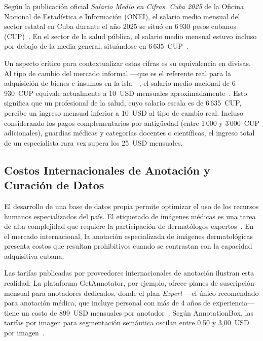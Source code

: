Según la publicación oficial \textit{Salario Medio en Cifras. Cuba 2025} de la Oficina Nacional de 
Estadística e Información (ONEI), el salario medio mensual del sector estatal en Cuba durante el año 
2025 se situó en 6\,930 pesos cubanos (CUP)~\cite{onei_salario_2025}. En el sector de la salud pública, el 
salario medio mensual estuvo incluso por debajo de la media general, situándose en 6\,635~CUP~\cite{onei_salario_2025}.

Un aspecto crítico para contextualizar estas cifras es su equivalencia en divisas. Al tipo de cambio 
del mercado informal ---que es el referente real para la adquisición de bienes e insumos en la 
isla---, el salario medio nacional de 6\,930~CUP equivale actualmente a 10~USD mensuales aproximadamente~\cite{el_toque_exchange_rates}. 
Esto significa que un profesional de la salud, 
cuyo salario escala es de 6\,635~CUP, percibe un ingreso mensual inferior a 10~USD al tipo de cambio 
real. Incluso considerando los pagos complementarios por antigüedad (entre 1\,000 y 3\,000~CUP 
adicionales), guardias médicas y categorías docentes o científicas, el ingreso total de un especialista 
rara vez supera los 25~USD mensuales.


\subsection{Costos Internacionales de Anotación y Curación de Datos}\label{sec:etiquetado}

El desarrollo de una base de datos propia permite optimizar el uso de los recursos humanos especializados del 
país. El etiquetado de imágenes médicas es una tarea de alta complejidad que requiere la participación de 
dermatólogos expertos~\cite{datavlab_annotation,medrxiv_preannotation}. En el mercado internacional, la 
anotación especializada de imágenes dermatológicas presenta costos que resultan prohibitivos 
cuando se contrastan con la capacidad adquisitiva cubana.

Las tarifas publicadas por proveedores internacionales de anotación ilustran esta realidad. La plataforma 
GetAnnotator, por ejemplo, ofrece planes de suscripción mensual para anotadores dedicados, donde el plan 
\textit{Expert} ---el único recomendado para anotación médica, que incluye personal con más de 4 años de 
experiencia--- tiene un costo de 899~USD mensuales por anotador~\cite{getannotator_pricing}. Según 
AnnotationBox, las tarifas por imagen para segmentación semántica oscilan entre 0,50 y 3,00~USD por 
imagen~\cite{annotationbox_pricing}.

